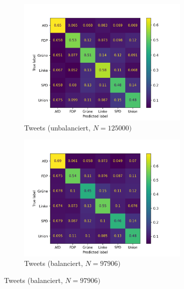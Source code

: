 \begin{figure}[H]
    \begin{subfigure}{0.5\textwidth}
      \centering
      \includegraphics[width=0.9\textwidth]{data/images/modeling/baseline/none/tweets_confusion_matrix.png}
      \caption{Tweets (unbalanciert, \(N=\num{125000})\)} \label{sfig:confusionMatrixBaselineTweets}
    \end{subfigure}
    \begin{subfigure}{0.5\textwidth}
      \centering
      \includegraphics[width=0.9\textwidth]{data/images/modeling/baseline/under/tweets_confusion_matrix.png}
      \caption{Tweets (balanciert, \(N=\num{97906})\)} \label{sfig:confusionMatrixBaselineTweetsBalanced}
    \end{subfigure}
    

\end{figure}
